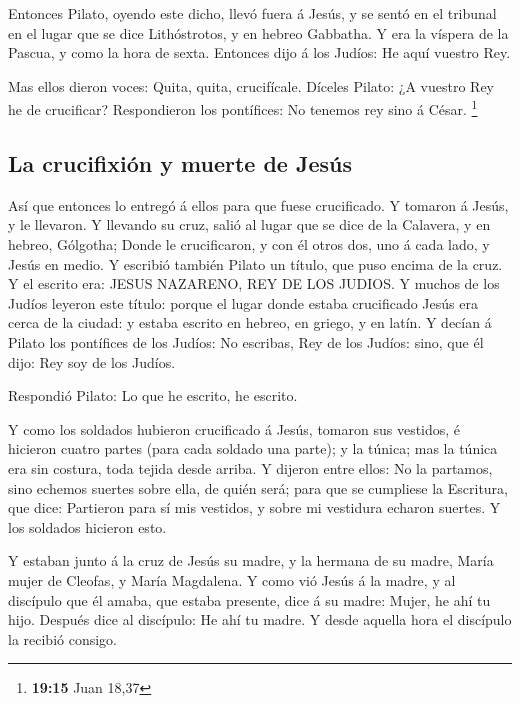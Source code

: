  Entonces Pilato, oyendo este dicho, llevó fuera á Jesús, y
se sentó en el tribunal en el lugar que se dice Lithóstrotos, y en
hebreo Gabbatha.  Y era la víspera de la Pascua, y como la
hora de sexta. Entonces dijo á los Judíos: He aquí vuestro Rey.

 Mas ellos dieron voces: Quita, quita, crucifícale. Díceles
Pilato: ¿A vuestro Rey he de crucificar? Respondieron los pontífices: No
tenemos rey sino á César. \footnote{\textbf{19:15} Juan 18,37}

\hypertarget{la-crucifixiuxf3n-y-muerte-de-jesuxfas}{%
\subsection{La crucifixión y muerte de
Jesús}\label{la-crucifixiuxf3n-y-muerte-de-jesuxfas}}

 Así que entonces lo entregó á ellos para que fuese
crucificado. Y tomaron á Jesús, y le llevaron.  Y llevando
su cruz, salió al lugar que se dice de la Calavera, y en hebreo,
Gólgotha;  Donde le crucificaron, y con él otros dos, uno á
cada lado, y Jesús en medio.  Y escribió también Pilato un
título, que puso encima de la cruz. Y el escrito era: JESUS NAZARENO,
REY DE LOS JUDIOS.  Y muchos de los Judíos leyeron este
título: porque el lugar donde estaba crucificado Jesús era cerca de la
ciudad: y estaba escrito en hebreo, en griego, y en latín. 
Y decían á Pilato los pontífices de los Judíos: No escribas, Rey de los
Judíos: sino, que él dijo: Rey soy de los Judíos.

 Respondió Pilato: Lo que he escrito, he escrito.

 Y como los soldados hubieron crucificado á Jesús, tomaron
sus vestidos, é hicieron cuatro partes (para cada soldado una parte); y
la túnica; mas la túnica era sin costura, toda tejida desde arriba.
 Y dijeron entre ellos: No la partamos, sino echemos
suertes sobre ella, de quién será; para que se cumpliese la Escritura,
que dice: Partieron para sí mis vestidos, y sobre mi vestidura echaron
suertes. Y los soldados hicieron esto.

 Y estaban junto á la cruz de Jesús su madre, y la hermana
de su madre, María mujer de Cleofas, y María Magdalena.  Y
como vió Jesús á la madre, y al discípulo que él amaba, que estaba
presente, dice á su madre: Mujer, he ahí tu hijo.  Después
dice al discípulo: He ahí tu madre. Y desde aquella hora el discípulo la
recibió consigo.

